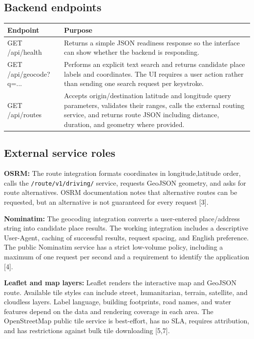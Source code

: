 \documentclass[11pt,a4paper]{article}
\begin{document}
\subsection{Backend endpoints}
\begin{tabularx}{\textwidth}{>{\ttfamily}p{} X}
\toprule
\textbf{Endpoint} & \textbf{Purpose}\\
\midrule
GET /api/health & Returns a simple JSON readiness response so the interface can show whether the backend is responding.\\
GET /api/geocode?q=... & Performs an explicit text search and returns candidate place labels and coordinates. The UI requires a user action rather than sending one search request per keystroke.\\
GET /api/routes & Accepts origin/destination latitude and longitude query parameters, validates their ranges, calls the external routing service, and returns route JSON including distance, duration, and geometry where provided.\\
\bottomrule
\end{tabularx}

\subsection{External service roles}
\textbf{OSRM:} The route integration formats coordinates in longitude,latitude order, calls the \texttt{/route/v1/driving/} service, requests GeoJSON geometry, and asks for route alternatives. OSRM documentation notes that alternative routes can be requested, but an alternative is not guaranteed for every request [3].

\textbf{Nominatim:} The geocoding integration converts a user-entered place/address string into candidate place results. The working integration includes a descriptive User-Agent, caching of successful results, request spacing, and English preference. The public Nominatim service has a strict low-volume policy, including a maximum of one request per second and a requirement to identify the application [4].

\textbf{Leaflet and map layers:} Leaflet renders the interactive map and GeoJSON route. Available tile styles can include street, humanitarian, terrain, satellite, and cloudless layers. Label language, building footprints, road names, and water features depend on the data and rendering coverage in each area. The OpenStreetMap public tile service is best-effort, has no SLA, requires attribution, and has restrictions against bulk tile downloading [5,7].
\end{document}
